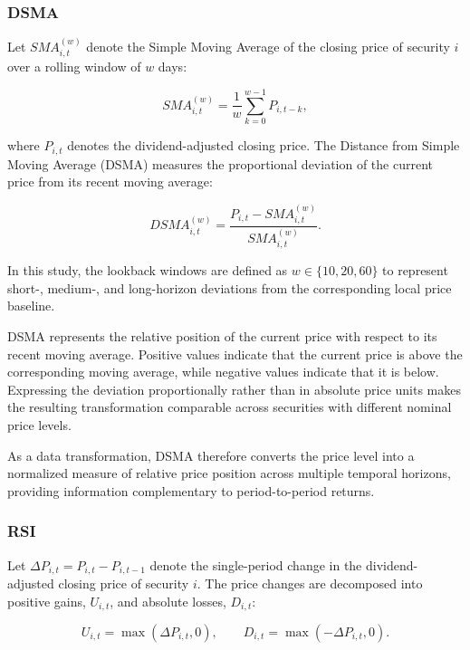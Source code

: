 \subsubsection{\acf{DSMA}}
Let $SMA_{i,t}^{(w)}$ denote the Simple Moving Average of the closing price of security $i$ over a rolling window of $w$ days:

\begin{equation}
    SMA_{i,t}^{(w)}
    =
    \frac{1}{w}
    \sum_{k=0}^{w-1} P_{i,t-k},
\end{equation}

where $P_{i,t}$ denotes the dividend-adjusted closing price. The Distance from Simple Moving Average (DSMA) measures the proportional deviation of the current price from its recent moving average:

\begin{equation}
    DSMA_{i,t}^{(w)}
    =
    \frac{P_{i,t}-SMA_{i,t}^{(w)}}
    {SMA_{i,t}^{(w)}}.
\end{equation}

In this study, the lookback windows are defined as
$w\in\{10,20,60\}$ to represent short-, medium-, and long-horizon deviations from the corresponding local price baseline.

\medskip

DSMA represents the relative position of the current price with respect to its recent moving average. Positive values indicate that the current price is above the corresponding moving average, while negative values indicate that it is below. Expressing the deviation proportionally rather than in absolute price units makes the resulting transformation comparable across securities with different nominal price levels.

\medskip

As a data transformation, DSMA therefore converts the price level into a normalized measure of relative price position across multiple temporal horizons, providing information complementary to period-to-period returns.

\subsubsection{\acf{RSI}}
Let
$\Delta P_{i,t}=P_{i,t}-P_{i,t-1}$
denote the single-period change in the dividend-adjusted closing price of security $i$. The price changes are decomposed into positive gains, $U_{i,t}$, and absolute losses, $D_{i,t}$:

\begin{equation}
    U_{i,t}=\max(\Delta P_{i,t},0),
    \qquad
    D_{i,t}=\max(-\Delta P_{i,t},0).
\end{equation}

